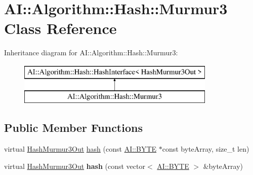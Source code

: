 \hypertarget{classAI_1_1Algorithm_1_1Hash_1_1Murmur3}{\section{A\-I\-:\-:Algorithm\-:\-:Hash\-:\-:Murmur3 Class Reference}
\label{classAI_1_1Algorithm_1_1Hash_1_1Murmur3}
}
Inheritance diagram for A\-I\-:\-:Algorithm\-:\-:Hash\-:\-:Murmur3\-:\begin{figure}[H]
\begin{center}
\leavevmode
\includegraphics[height=2.000000cm]{classAI_1_1Algorithm_1_1Hash_1_1Murmur3}
\end{center}
\end{figure}
\subsection*{Public Member Functions}
\begin{DoxyCompactItemize}
\item 
virtual \hyperlink{structAI_1_1Algorithm_1_1Hash_1_1HashMurmur3Out}{Hash\-Murmur3\-Out} \hyperlink{classAI_1_1Algorithm_1_1Hash_1_1Murmur3_ab79d4cbd685e34c88077d58e5cacf7a3}{hash} (const \hyperlink{namespaceAI_a9d4bcda82fe0f9aac3c4861e24491581}{A\-I\-::\-B\-Y\-T\-E} $\ast$const byte\-Array, size\-\_\-t len)
\item 
\hypertarget{classAI_1_1Algorithm_1_1Hash_1_1Murmur3_a552acfee5455ac802af225bfd89d80db}{virtual \hyperlink{structAI_1_1Algorithm_1_1Hash_1_1HashMurmur3Out}{Hash\-Murmur3\-Out} {\bfseries hash} (const vector$<$ \hyperlink{namespaceAI_a9d4bcda82fe0f9aac3c4861e24491581}{A\-I\-::\-B\-Y\-T\-E} $>$ \&byte\-Array)}\label{classAI_1_1Algorithm_1_1Hash_1_1Murmur3_a552acfee5455ac802af225bfd89d80db}

\end{DoxyCompactItemize}


